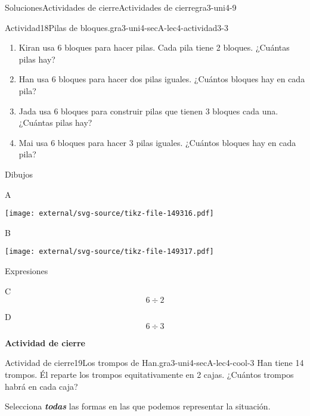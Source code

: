 \documentclass[twoside,10pt,]{article}
\newcommand{\alert}[1]{\textbf{\textit{#1}}}
\begin{document}
\begin{solutions-section}{Soluciones}{Actividades de cierre}{}{Actividades de cierre}{}{}{gra3-uni4-9}
\begin{activitysolution}{Actividad}{18}{Pilas de bloques.}{gra3-uni4-secA-lec4-actividad3-3}
%
\begin{enumerate}
\item{}Kiran usa 6 bloques para hacer pilas. Cada pila tiene 2 bloques. ¿Cuántas pilas hay?%
\item{}Han usa 6 bloques para hacer dos pilas iguales. ¿Cuántos bloques hay en cada pila?%
\item{}Jada usa 6 bloques para construir pilas que tienen 3 bloques cada una. ¿Cuántas pilas hay?%
\item{}Mai usa 6 bloques para hacer 3 pilas iguales. ¿Cuántos bloques hay en cada pila?%
\end{enumerate}
Dibujos%
\begin{sidebyside}{2}{0.05}{0.05}{0.1}%
\begin{sbspanel}{0.4}%
A%
\par
\texttt{[image: external/svg-source/tikz-file-149316.pdf]}
\end{sbspanel}%
\begin{sbspanel}{0.4}%
B%
\par
\texttt{[image: external/svg-source/tikz-file-149317.pdf]}
\end{sbspanel}%
\end{sidebyside}%
\par
Expresiones%
\begin{sidebyside}{2}{0.05}{0.05}{0.1}%
\begin{sbspanel}{0.4}%
C%
\begin{equation*}
6\div 2
\end{equation*}
%
\end{sbspanel}%
\begin{sbspanel}{0.4}%
\par
D%
\begin{equation*}
6\div 3
\end{equation*}
%
\end{sbspanel}%
\end{sidebyside}%
\end{activitysolution}%
\par\medskip
\noindent\textbf{\large{}\space\textperiodcentered\space{}Actividad de cierre}
\begin{projectsolution}{Actividad de cierre}{19}{Los trompos de Han.}{gra3-uni4-secA-lec4-cool-3}%
Han tiene 14 trompos. Él reparte los trompos equitativamente en 2 cajas. ¿Cuántos trompos habrá en cada caja?%
\par
Selecciona \alert{todas} las formas en las que podemos representar la situación.%
\begin{sidebyside}{4}{0.0075}{0.0075}{0.015}%

\end{sidebyside}
\end{projectsolution}
\end{solutions-section}
\end{document}

